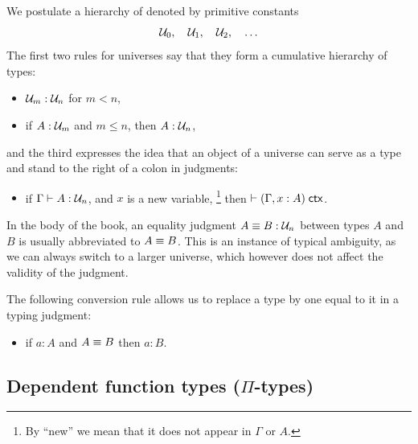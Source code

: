 We postulate a hierarchy of  denoted by primitive constants
%
\begin{equation*}
  \mathcal{U}_0, \quad \mathcal{U}_1, \quad  \mathcal{U}_2, \quad \ldots
\end{equation*}
%
The first two rules for universes say that they form a cumulative hierarchy of types:
%
\begin{itemize}
\item $\mathcal{U}_m : \mathcal{U}_n$ for $m < n$,
\item if $A:\mathcal{U}_m$ and $m \le n$, then $A:\mathcal{U}_n$,
\end{itemize}
%
and the third expresses the idea that an object of a universe can serve as a type and stand to the
right of a colon in judgments:
%
\begin{itemize}
\item if $\Gamma \vdash A : \mathcal{U}_n$, and $x$ is a new variable,%
\footnote{By ``new'' we mean that it does not appear in $\Gamma$ or $A$.}
then $\vdash (\Gamma, x:A)\; \mathsf{ctx}$.
\end{itemize}
%
In the body of the book, an equality judgment $A \equiv B : \mathcal{U}_n$ between types
$A$ and $B$ is usually abbreviated to $A \equiv B$. This is an instance of
typical ambiguity, as we can always switch to a larger universe, which however does not affect the validity of the judgment.

The following conversion rule allows us to replace a type by one equal to it in a typing judgment:
%
\begin{itemize}
\item if $a:A$ and $A \equiv B$ then $a:B$.
\end{itemize}

\subsection{Dependent function types (\texorpdfstring{$\Pi$}{Π}-types)}

